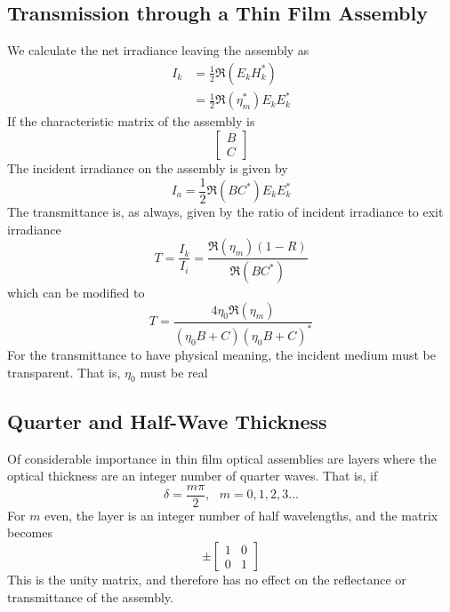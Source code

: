 \documentclass{article}
\begin{document}
\subsection{Transmission through a Thin Film Assembly}
    We calculate the net irradiance leaving the assembly as
    \begin{align}
        I_k &= \frac{1}{2}\Re\left(E_k H_k^*\right) \\
            &= \frac{1}{2}\Re\left(\eta_m^*\right) E_k E_k^*
    \end{align}
    If the characteristic matrix of the assembly is
    \begin{equation*}
        \begin{bmatrix}
            B \\
            C
        \end{bmatrix}        
    \end{equation*}
    The incident irradiance on the assembly is given by
    \begin{equation}
        I_a = \frac{1}{2}\Re\left(BC^*\right)E_k E_k^*        
    \end{equation}
    The transmittance is, as always, given by the ratio of incident irradiance to exit irradiance
    \begin{equation}
        T = \frac{I_k}{I_i} = \frac{\Re\left(\eta_m\right)(1-R)}{\Re\left(B C^*\right)}        
    \end{equation}
    which can be modified to
    \begin{equation}
        T = \frac{4 \eta_0 \Re(\eta_m)}{(\eta_0 B + C)(\eta_0 B + C)^*} 
    \end{equation}
    For the transmittance to have physical meaning, the incident medium must be transparent. That is, $\eta_0$ must be real

\subsection{Quarter and Half-Wave Thickness}
    Of considerable importance in thin film optical assemblies are layers where the optical thickness are an integer number of quarter waves. That is, if
    \begin{equation*}  
        \delta = \frac{m \pi}{2}, \text{	} m = 0, 1, 2, 3 \ldots
    \end{equation*}
    For $m$ even, the layer is an integer number of half wavelengths, and the matrix becomes
    \begin{equation*}
        \pm
        \begin{bmatrix}
            1 & 0 \\
            0 & 1                        
        \end{bmatrix}
    \end{equation*}
    This is the unity matrix, and therefore has no effect on the reflectance or transmittance of the assembly.
\end{document}
